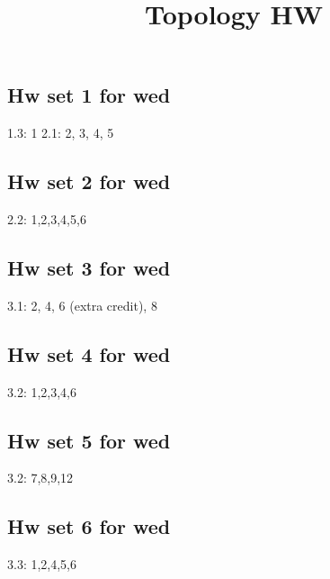 \documentclass{amsart}
\numberwithin{equation}{section}
\theoremstyle{definition}
\theoremstyle{remark}
\begin{document}
\title{Topology HW}
\maketitle
\subsection*{Hw set 1 for wed}
1.3: 1  
2.1: 2, 3, 4, 5  
\subsection*{Hw set 2 for wed}
2.2: 1,2,3,4,5,6
\subsection*{Hw set 3 for wed}
3.1: 2, 4, 6 (extra credit), 8
\subsection*{Hw set 4 for wed}
3.2: 1,2,3,4,6
\subsection*{Hw set 5 for wed}
3.2: 7,8,9,12
\subsection*{Hw set 6 for wed}
3.3: 1,2,4,5,6   
\end{document}
